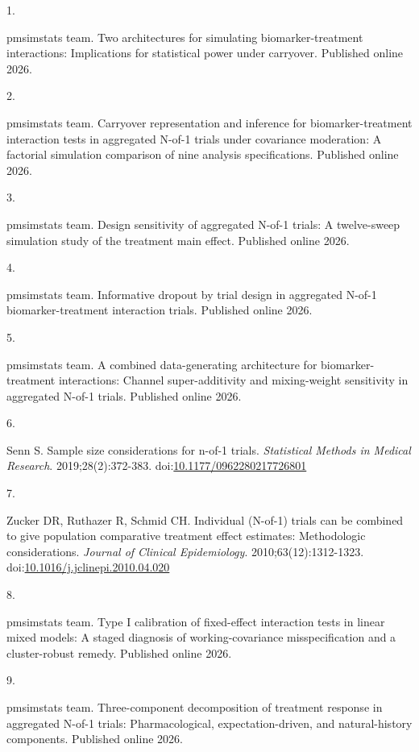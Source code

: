 \documentclass[
  11pt,
]{article}
\newlength{\cslhangindent}
\newlength{\csllabelwidth}
\newenvironment{CSLReferences}[2] %
 {\begin{list}{}{%
  \setlength{\itemindent}{0pt}
  \setlength{\leftmargin}{0pt}
  \setlength{\parsep}{0pt}
  \ifodd #1
   \setlength{\leftmargin}{\cslhangindent}
   \setlength{\itemindent}{-1\cslhangindent}
  \fi
  \setlength{\itemsep}{#2\baselineskip}}}
 {\end{list}}
\newcommand{\CSLLeftMargin}[1]{\parbox[t]{\csllabelwidth}{\strut#1\strut}}
\newcommand{\CSLRightInline}[1]{\parbox[t]{\linewidth - \csllabelwidth}{\strut#1\strut}}
\begin{document}
\protect{}\label{refs}
\begin{CSLReferences}{0}{1}
\CSLLeftMargin{1. }%
\CSLRightInline{{pmsimstats team}. Two architectures for simulating biomarker-treatment interactions: Implications for statistical power under carryover. Published online 2026.}

\CSLLeftMargin{2. }%
\CSLRightInline{{pmsimstats team}. Carryover representation and inference for biomarker-treatment interaction tests in aggregated {N}-of-1 trials under covariance moderation: A factorial simulation comparison of nine analysis specifications. Published online 2026.}

\CSLLeftMargin{3. }%
\CSLRightInline{{pmsimstats team}. Design sensitivity of aggregated {N}-of-1 trials: A twelve-sweep simulation study of the treatment main effect. Published online 2026.}

\CSLLeftMargin{4. }%
\CSLRightInline{{pmsimstats team}. Informative dropout by trial design in aggregated {N}-of-1 biomarker-treatment interaction trials. Published online 2026.}

\CSLLeftMargin{5. }%
\CSLRightInline{{pmsimstats team}. A combined data-generating architecture for biomarker-treatment interactions: Channel super-additivity and mixing-weight sensitivity in aggregated {N}-of-1 trials. Published online 2026.}

\CSLLeftMargin{6. }%
\CSLRightInline{Senn S. Sample size considerations for n-of-1 trials. \emph{Statistical Methods in Medical Research}. 2019;28(2):372-383. doi:\href{https://doi.org/10.1177/0962280217726801}{10.1177/0962280217726801}}

\CSLLeftMargin{7. }%
\CSLRightInline{Zucker DR, Ruthazer R, Schmid CH. Individual ({N-of-1}) trials can be combined to give population comparative treatment effect estimates: Methodologic considerations. \emph{Journal of Clinical Epidemiology}. 2010;63(12):1312-1323. doi:\href{https://doi.org/10.1016/j.jclinepi.2010.04.020}{10.1016/j.jclinepi.2010.04.020}}

\CSLLeftMargin{8. }%
\CSLRightInline{{pmsimstats team}. Type {I} calibration of fixed-effect interaction tests in linear mixed models: A staged diagnosis of working-covariance misspecification and a cluster-robust remedy. Published online 2026.}

\CSLLeftMargin{9. }%
\CSLRightInline{{pmsimstats team}. Three-component decomposition of treatment response in aggregated {N}-of-1 trials: Pharmacological, expectation-driven, and natural-history components. Published online 2026.}

\end{CSLReferences}
\end{document}
